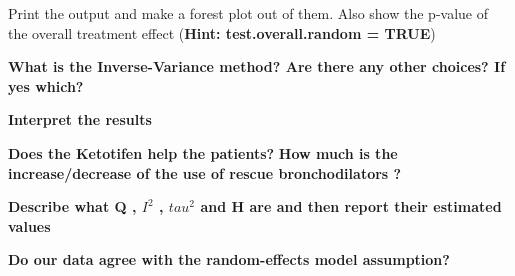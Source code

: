 \documentclass[]{article}
\begin{document}
Print the output and make a forest plot out of them. Also show the
p-value of the overall treatment effect (\textbf{Hint:
test.overall.random = TRUE})

\textbf{What is the Inverse-Variance method? Are there any other
choices? If yes which?}

\newline 

\newline 

\newline 

\textbf{Interpret the results}

\newline 

\newline 

\newline 

\newline 

\newline 

\newline 

\textbf{Does the Ketotifen help the patients?} \textbf{How much is the
increase/decrease of the use of rescue bronchodilators ?} \newline 

\newline 

\newline 

\newline 

\newline 

\newline 

\textbf{Describe what Q , \(I^2\) , \(tau^2\) and H are and then report
their estimated values}

\newline 

\newline 

\newline 

\newline 

\newline 

\newline 

\textbf{Do our data agree with the random-effects model assumption?}
\end{document}
